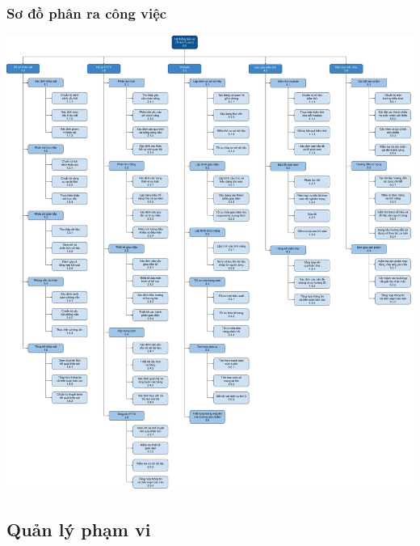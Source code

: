 \documentclass[12pt]{article}
\begin{document}
\subsubsection{Sơ đồ phân ra công việc}
\vspace{1cm}
\hspace{-2.5cm}\includegraphics[width=20cm]{WBS.jpg}
\vspace{1cm}
\newpage
\subsection{Quản lý phạm vi}
\end{document}
